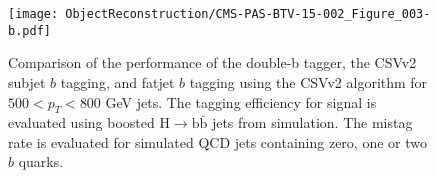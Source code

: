 \begin{figure}[h!]
\begin{center}
\texttt{[image: ObjectReconstruction/CMS-PAS-BTV-15-002\_Figure\_003-b.pdf]}
\end{center}
\caption{Comparison of the performance of the double-b tagger, the CSVv2 subjet $b$ tagging, and fatjet $b$ tagging using the CSVv2 algorithm for $500 < p_{T} < 800$ GeV jets. The tagging efficiency for signal is evaluated using boosted $\mathrm{H}\rightarrow\mathrm{b\bar{b}}$ jets from simulation. The mistag rate is evaluated for simulated QCD jets containing zero, one or two $b$ quarks\cite{DoubleB}.}
\label{fig:DoubleBperformance}
\end{figure}












